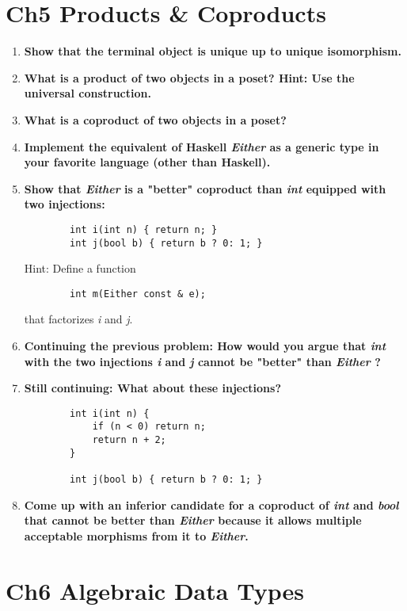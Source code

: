 \documentclass{article}
\begin{document}
\section{Ch5 Products \& Coproducts}
\begin{enumerate}
	\item \textbf{Show that the terminal object is unique up to unique isomorphism.}
	\item \textbf{What is a product of two objects in a poset? Hint: Use the universal construction.}
	\item \textbf{What is a coproduct of two objects in a poset?}
	\item \textbf{Implement the equivalent of Haskell \textit{Either} as a generic type in your favorite language (other than Haskell).}
	\item \textbf{Show that \textit{Either} is a "better" coproduct than \textit{int} equipped with two injections:}
	      \begin{verbatim}
		int i(int n) { return n; }	
		int j(bool b) { return b ? 0: 1; }
		\end{verbatim}
	      Hint: Define a function
	      \begin{verbatim}
		int m(Either const & e);	
		\end{verbatim}
	      that factorizes \textit{i} and \textit{j}.
	\item \textbf{Continuing the previous problem: How would you argue that \textit{int} with the two injections \textit{i} and \textit{j} cannot be "better" than \textit{Either} ?}
	\item \textbf{Still continuing: What about these injections?}
	      \begin{verbatim}
		int i(int n) {
			if (n < 0) return n;
			return n + 2;
		}
		
		int j(bool b) { return b ? 0: 1; }
		\end{verbatim}
	\item \textbf{Come up with an inferior candidate for a coproduct of \textit{int} and \textit{bool} that cannot be better than \textit{Either} because it allows multiple acceptable morphisms from it to \textit{Either}.}
\end{enumerate}

\section{Ch6 Algebraic Data Types}
\end{document}
